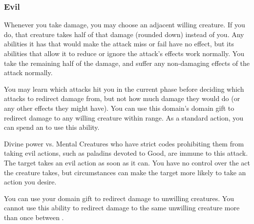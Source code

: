         \subsubsection{Evil}
             Whenever you take damage, you may choose an adjacent willing creature.
            If you do, that creature takes half of that damage (rounded down) instead of you.
            Any abilities it has that would make the attack miss or fail have no effect, but its abilities that allow it to reduce or ignore the attack's effects work normally.
            You take the remaining half of the damage, and suffer any non-damaging effects of the attack normally.
            \par You may learn which attacks hit you in the current phase before deciding which attacks to redirect damage from, but not how much damage they would do (or any other effects they might have).
             You can use this domain's domain gift to redirect damage to any willing creature within \rngclose range.
             As a standard action, you can spend an  to use this ability.
            \begin{ability}
                \begin{spelltargetinginfo}
                \end{spelltargetinginfo}
                \begin{spelleffects}
                    \begin{spellattack}{Divine power vs. Mental}
                        \spellspecial Creatures who have strict codes prohibiting them from taking evil actions, such as paladins devoted to Good, are immune to this attack.
                        \spellsuccess The target takes an evil action as soon as it can.
                        You have no control over the act the creature takes, but circumstances can make the target more likely to take an action you desire.
                    \end{spellattack}
                \end{spelleffects}
            \end{ability}
             You can use your domain gift to redirect damage to unwilling creatures.
            You cannot use this ability to redirect damage to the same unwilling creature more than once between .

